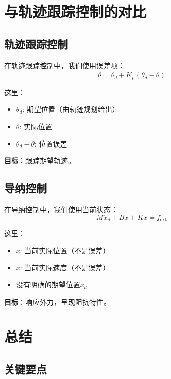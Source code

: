 \documentclass[12pt,a4paper]{article}
\begin{document}
\section{与轨迹跟踪控制的对比}

\subsection{轨迹跟踪控制}

在轨迹跟踪控制中，我们使用误差项：
\begin{equation}
\dot{\theta} = \dot{\theta}_d + K_p(\theta_d - \theta)
\end{equation}

这里：
\begin{itemize}
\item $\theta_d$: 期望位置（由轨迹规划给出）
\item $\theta$: 实际位置
\item $\theta_d - \theta$: 位置误差
\end{itemize}

\textbf{目标}：跟踪期望轨迹。

\subsection{导纳控制}

在导纳控制中，我们使用当前状态：
\begin{equation}
M\ddot{x}_d + B\dot{x} + Kx = f_{\text{ext}}
\end{equation}

这里：
\begin{itemize}
\item $x$: 当前实际位置（不是误差）
\item $\dot{x}$: 当前实际速度（不是误差）
\item 没有明确的期望位置$x_d$
\end{itemize}

\textbf{目标}：响应外力，呈现阻抗特性。

\section{总结}

\subsection{关键要点}
\end{document}
